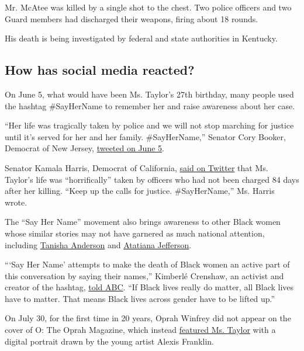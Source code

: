 Mr. McAtee was killed by a single shot to the chest. Two police officers
and two Guard members had discharged their weapons, firing about 18
rounds.

His death is being investigated by federal and state authorities in
Kentucky.

\hypertarget{how-has-social-media-reacted}{%
\subsection{How has social media
reacted?}\label{how-has-social-media-reacted}}

On June 5, what would have been Ms. Taylor's 27th birthday, many people
used the hashtag \#SayHerName to remember her and raise awareness about
her case.

``Her life was tragically taken by police and we will not stop marching
for justice until it's served for her and her family. \#SayHerName,''
Senator Cory Booker, Democrat of New Jersey,
\href{https://twitter.com/CoryBooker/status/1268961372836188163}{tweeted
on June 5}.

Senator Kamala Harris, Democrat of California,
\href{https://twitter.com/KamalaHarris/status/1268905322837692428}{said
on Twitter} that Ms. Taylor's life was ``horrifically'' taken by
officers who had not been charged 84 days after her killing. ``Keep up
the calls for justice. \#SayHerName,'' Ms. Harris wrote.

The ``Say Her Name'' movement also brings awareness to other Black women
whose similar stories may not have garnered as much national attention,
including
\href{https://www.nytimes3xbfgragh.onion/2015/05/25/us/71-arrested-in-cleveland-protests-over-officers-acquittal-police-say.html}{Tanisha
Anderson} and
\href{https://www.nytimes3xbfgragh.onion/2019/10/15/us/aaron-dean-atatiana-jefferson.html}{Atatiana
Jefferson}.

```Say Her Name' attempts to make the death of Black women an active
part of this conversation by saying their names,'' Kimberlé Crenshaw, an
activist and creator of the hashtag,
\href{https://twitter.com/GMA/status/1268881611011039234?ref_src=twsrc\%5Etfw\%7Ctwcamp\%5Etweetembed\%7Ctwterm\%5E1268881611011039234\&ref_url=https\%3A\%2F\%2Fpeople.com\%2Fcrime\%2Fbreonna-taylors-mom-mourns-daughter-on-what-wouldve-been-her-27th-birthday\%2F}{told
ABC}. ``If Black lives really do matter, all Black lives have to matter.
That means Black lives across gender have to be lifted up.''

On July 30, for the first time in 20 years, Oprah Winfrey did not appear
on the cover of O: The Oprah Magazine, which instead
\href{https://www.nytimes3xbfgragh.onion/2020/07/30/business/media/oprah-magazine-breonna-taylor-cover.html}{featured
Ms. Taylor} with a digital portrait drawn by the young artist Alexis
Franklin.

